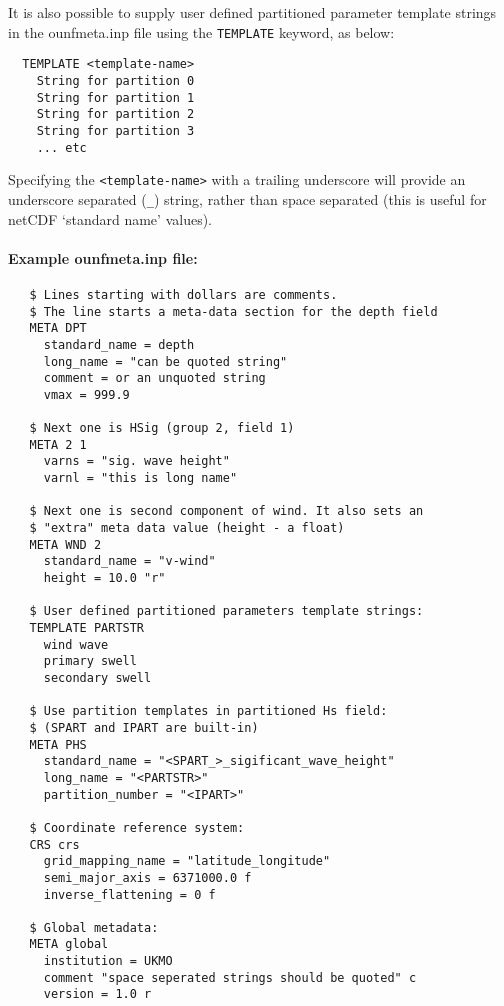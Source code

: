 \noindent
It is also possible to supply user defined partitioned parameter
template strings in the ounfmeta.inp file using the \texttt{TEMPLATE}
keyword, as below:

\begin{verbatim}
  TEMPLATE <template-name>
    String for partition 0
    String for partition 1
    String for partition 2
    String for partition 3
    ... etc
\end{verbatim}

\noindent
Specifying the \texttt{<template-name>} with a trailing underscore will
provide an underscore separated (\texttt{\_}) string, rather than space
separated (this is useful for netCDF `standard name' values).


\noindent
\paragraph{Example ounfmeta.inp file:}
\begin{verbatim}
   $ Lines starting with dollars are comments.
   $ The line starts a meta-data section for the depth field
   META DPT
     standard_name = depth
     long_name = "can be quoted string"
     comment = or an unquoted string
     vmax = 999.9

   $ Next one is HSig (group 2, field 1)
   META 2 1
     varns = "sig. wave height"
     varnl = "this is long name"

   $ Next one is second component of wind. It also sets an
   $ "extra" meta data value (height - a float)
   META WND 2
     standard_name = "v-wind"
     height = 10.0 "r"

   $ User defined partitioned parameters template strings:
   TEMPLATE PARTSTR
     wind wave
     primary swell
     secondary swell

   $ Use partition templates in partitioned Hs field:
   $ (SPART and IPART are built-in)
   META PHS
     standard_name = "<SPART_>_sigificant_wave_height"
     long_name = "<PARTSTR>"
     partition_number = "<IPART>"

   $ Coordinate reference system:
   CRS crs
     grid_mapping_name = "latitude_longitude"
     semi_major_axis = 6371000.0 f
     inverse_flattening = 0 f

   $ Global metadata:
   META global
     institution = UKMO
     comment "space seperated strings should be quoted" c
     version = 1.0 r

\end{verbatim}


\noindent
